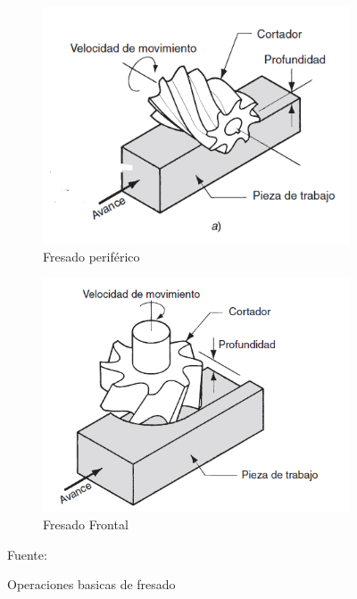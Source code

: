 \begin{figure}[hbt]
    \centering
    \begin{subfigure}{0.4\textwidth}
        \centering
        \includegraphics[width=0.9\linewidth]{Cap1_FormulaciondelProyecto/FresadoPeriferico.PNG}
        \caption{Fresado periférico}
        \label{fig:FP}
    \end{subfigure} 
 \begin{subfigure}{0.4\textwidth}
        \centering
        \includegraphics[width=0.9\linewidth]{Cap1_FormulaciondelProyecto/FresadoFrontal.PNG}
        \caption{Fresado Frontal}
        \label{fig:FF}
    \end{subfigure} 
    \caption{Operaciones basicas de fresado}{Fuente: \citep{groover2007fundamentals}}
    \label{fig:FresadoBasico}
\end{figure}

